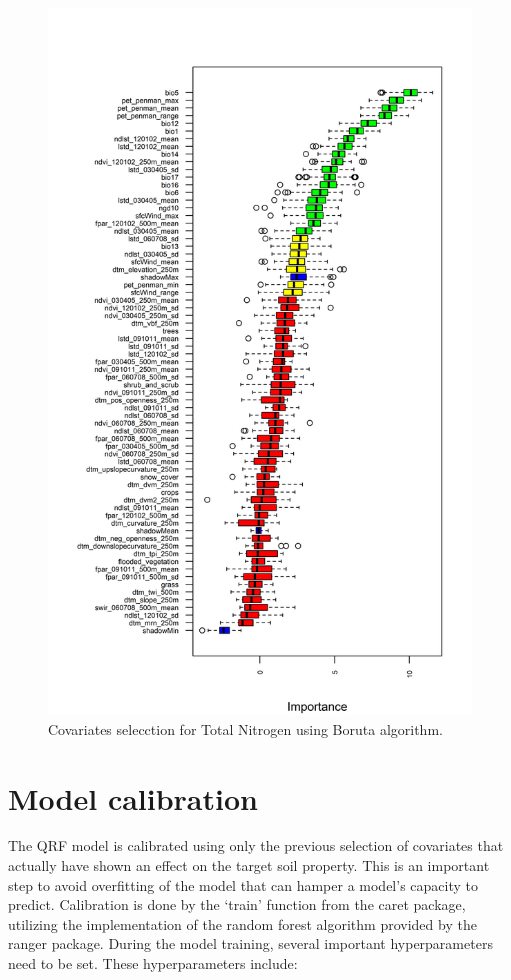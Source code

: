 \documentclass[
  10pt,
  b5paper,
  oneside]{book}
\begin{document}
\begin{figure}
\includegraphics[width=49.21in]{images/importance_n_0_30} \caption{Covariates selecction for Total Nitrogen using Boruta algorithm.}\label{fig:borutaplot}
\end{figure}

\hypertarget{model-calibration}{%
\section{Model calibration}\label{model-calibration}}

The QRF model is calibrated using only the previous selection of covariates that actually have shown an effect on the target soil property. This is an important step to avoid overfitting of the model that can hamper a model's capacity to predict. Calibration is done by the `train' function from the caret package, utilizing the implementation of the random forest algorithm provided by the ranger package. During the model training, several important hyperparameters need to be set. These hyperparameters include:
\end{document}
